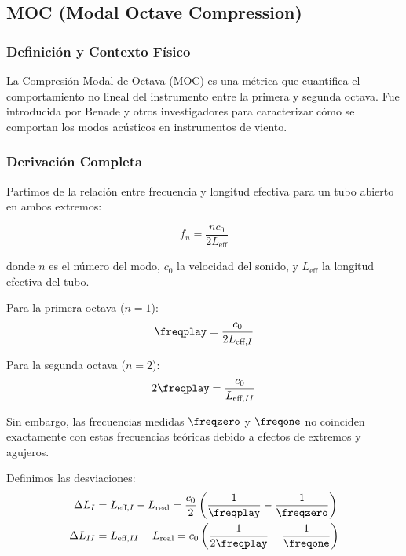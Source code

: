 
\subsection{MOC (Modal Octave Compression)}

\subsubsection{Definición y Contexto Físico}

La Compresión Modal de Octava (MOC) es una métrica que cuantifica el comportamiento no lineal del instrumento entre la primera y segunda octava. Fue introducida por Benade y otros investigadores para caracterizar cómo se comportan los modos acústicos en instrumentos de viento.

\subsubsection{Derivación Completa}

Partimos de la relación entre frecuencia y longitud efectiva para un tubo abierto en ambos extremos:

\begin{equation}
f_n = \frac{n c_0}{2 L_{\text{eff}}}
\label{eq:frecuencia_tubo}
\end{equation}

donde $n$ es el número del modo, $c_0$ la velocidad del sonido, y $L_{\text{eff}}$ la longitud efectiva del tubo.

Para la primera octava ($n=1$):
\begin{equation}
\freqplay = \frac{c_0}{2 L_{\text{eff},I}}
\label{eq:freq_play_I}
\end{equation}

Para la segunda octava ($n=2$):
\begin{equation}
2\freqplay = \frac{c_0}{L_{\text{eff},II}}
\label{eq:freq_play_II}
\end{equation}

Sin embargo, las frecuencias medidas $\freqzero$ y $\freqone$ no coinciden exactamente con estas frecuencias teóricas debido a efectos de extremos y agujeros.

Definimos las desviaciones:
\begin{align}
\Delta L_I &= L_{\text{eff},I} - L_{\text{real}} = \frac{c_0}{2}\left(\frac{1}{\freqplay} - \frac{1}{\freqzero}\right) \\
\Delta L_{II} &= L_{\text{eff},II} - L_{\text{real}} = c_0\left(\frac{1}{2\freqplay} - \frac{1}{\freqone}\right)
\end{align}

